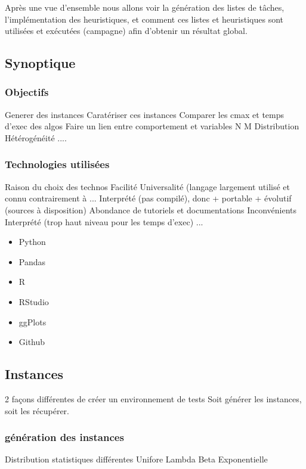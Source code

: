 \documentclass[a4paper,12pt]{report}
\theoremstyle{plain}				%
\theoremstyle{definition}				%
\begin{document}
Après une vue d'ensemble nous allons voir la génération des listes de tâches, l'implémentation des heuristiques, et comment ces listes et heuristiques sont utilisées et exécutées (campagne) afin d'obtenir un résultat global.

\subsection{Synoptique}\label{subsec:Synoptique}



\subsubsection{Objectifs}\label{subsubsec:Objectifs}
Generer des instances
Caratériser ces instances
Comparer les cmax et temps d'exec des algos
Faire un lien entre comportement et variables
 N
 M
 Distribution
 Hétérogénéité
 ....
 

\subsubsection{Technologies utilisées}\label{subsubsec:Technologies  utilisées}
Raison du choix des technos
 Facilité
 Universalité (langage largement utilisé et connu contrairement à ...
 Interprété (pas compilé), donc + portable + évolutif (sources à disposition)
 Abondance de tutoriels et documentations
Inconvénients
 Interprété (trop haut niveau pour les temps d'exec)
 ... 

\begin{itemize}

\item Python
\item Pandas
\item R
\item RStudio
\item ggPlots
\item Github


\end{itemize}

\subsection{Instances} \label{subsec:génération des instances}
2 façons différentes de créer un environnement de tests Soit générer les instances, soit les récupérer.

\subsubsection{génération des instances}\label{subsubsec:génération des instances}
Distribution statistiques différentes
 Unifore
 Lambda
 Beta
 Exponentielle
 
\end{document}
